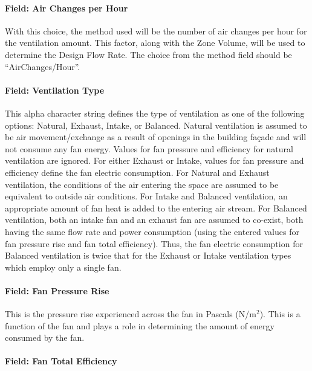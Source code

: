 \paragraph{Field: Air Changes per Hour}\label{field-air-changes-per-hour-1}

With this choice, the method used will be the number of air changes per hour for the ventilation amount. This factor, along with the Zone Volume, will be used to determine the Design Flow Rate. The choice from the method field should be ``AirChanges/Hour''.

\paragraph{Field: Ventilation Type}\label{field-ventilation-type}

This alpha character string defines the type of ventilation as one of the following options: Natural, Exhaust, Intake, or Balanced. Natural ventilation is assumed to be air movement/exchange as a result of openings in the building façade and will not consume any fan energy. Values for fan pressure and efficiency for natural ventilation are ignored. For either Exhaust or Intake, values for fan pressure and efficiency define the fan electric consumption. For Natural and Exhaust ventilation, the conditions of the air entering the space are assumed to be equivalent to outside air conditions. For Intake and Balanced ventilation, an appropriate amount of fan heat is added to the entering air stream. For Balanced ventilation, both an intake fan and an exhaust fan are assumed to co-exist, both having the same flow rate and power consumption (using the entered values for fan pressure rise and fan total efficiency). Thus, the fan electric consumption for Balanced ventilation is twice that for the Exhaust or Intake ventilation types which employ only a single fan.

\paragraph{Field: Fan Pressure Rise}\label{field-fan-pressure-rise}

This is the pressure rise experienced across the fan in Pascals (N/m\(^{2}\)). This is a function of the fan and plays a role in determining the amount of energy consumed by the fan.

\paragraph{Field: Fan Total Efficiency}\label{field-fan-total-efficiency}


